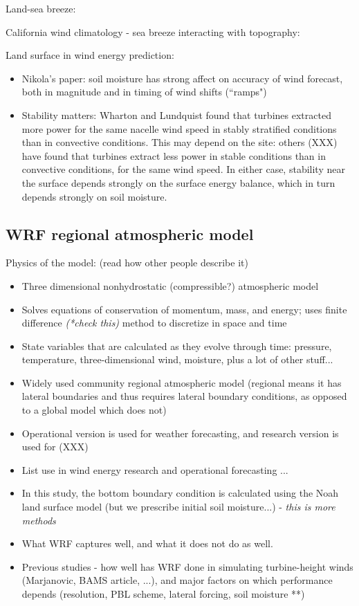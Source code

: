 \documentclass[12pt]{amsart}
\begin{document}
Land-sea breeze:

California wind climatology - sea breeze interacting with topography:

Land surface in wind energy prediction:
\begin{itemize}
\item Nikola's paper: soil moisture has strong affect on accuracy of wind forecast, both in magnitude and in timing of wind shifts (``ramps")
\item Stability matters: Wharton and Lundquist found that turbines extracted more power for the same nacelle wind speed in stably stratified conditions than in convective conditions.  This may depend on the site: others (XXX) have found that turbines extract less power in stable conditions than in convective conditions, for the same wind speed.  In either case, stability near the surface depends strongly on the surface energy balance, which in turn depends strongly on soil moisture.
\end{itemize}

\subsection{WRF regional atmospheric model}

Physics of the model: (read how other people describe it)
\begin{itemize}
\item Three dimensional nonhydrostatic (compressible?) atmospheric model
\item Solves equations of conservation of momentum, mass, and energy; uses finite difference \textit{(*check this)} method to discretize in space and time
\item State variables that are calculated as they evolve through time: pressure, temperature, three-dimensional wind, moisture, plus a lot of other stuff...
\item Widely used community regional atmospheric model (regional means it has lateral boundaries and thus requires lateral boundary conditions, as opposed to a global model which does not)
\item Operational version is used for weather forecasting, and research version is used for (XXX)
\item List use in wind energy research and operational forecasting ...
\item In this study, the bottom boundary condition is calculated using the Noah land surface model (but we prescribe initial soil moisture...) - \textit{this is more methods}
\item What WRF captures well, and what it does not do as well.
\item Previous studies - how well has WRF done in simulating turbine-height winds (Marjanovic, BAMS article, ...), and major factors on which performance depends (resolution, PBL scheme, lateral forcing, soil moisture **)
\end{itemize}
\end{document}
